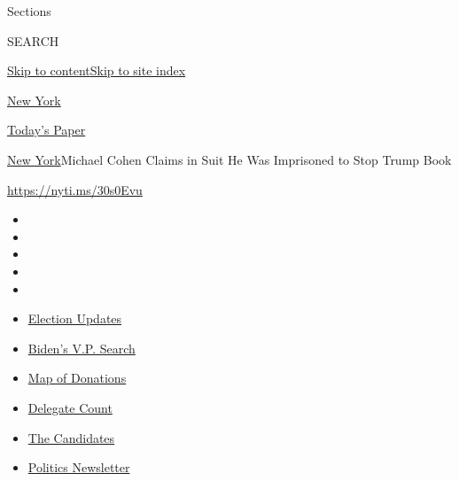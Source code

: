 Sections

SEARCH

\protect\hyperlink{site-content}{Skip to
content}\protect\hyperlink{site-index}{Skip to site index}

\href{https://www.nytimes3xbfgragh.onion/section/nyregion}{New York}

\href{https://myaccount.nytimes3xbfgragh.onion/auth/login?response_type=cookie\&client_id=vi}{}

\href{https://www.nytimes3xbfgragh.onion/section/todayspaper}{Today's
Paper}

\href{/section/nyregion}{New York}\textbar{}Michael Cohen Claims in Suit
He Was Imprisoned to Stop Trump Book

\url{https://nyti.ms/30s0Evu}

\begin{itemize}
\item
\item
\item
\item
\item
\end{itemize}

\begin{itemize}
\item
  \href{https://www.nytimes3xbfgragh.onion/2020/08/03/us/elections/biden-vs-trump.html?action=click\&pgtype=Article\&state=default\&region=TOP_BANNER\&context=storylines_menu}{Election
  Updates}
\item
  \href{https://www.nytimes3xbfgragh.onion/article/biden-vice-president-2020.html?action=click\&pgtype=Article\&state=default\&region=TOP_BANNER\&context=storylines_menu}{Biden's
  V.P. Search}
\item
  \href{https://www.nytimes3xbfgragh.onion/interactive/2020/07/24/us/politics/trump-biden-campaign-donors.html?action=click\&pgtype=Article\&state=default\&region=TOP_BANNER\&context=storylines_menu}{Map
  of Donations}
\item
  \href{https://www.nytimes3xbfgragh.onion/interactive/2020/us/elections/delegate-count-primary-results.html?action=click\&pgtype=Article\&state=default\&region=TOP_BANNER\&context=storylines_menu}{Delegate
  Count}
\item
  \href{https://www.nytimes3xbfgragh.onion/interactive/2019/us/politics/2020-presidential-candidates.html?action=click\&pgtype=Article\&state=default\&region=TOP_BANNER\&context=storylines_menu}{The
  Candidates}
\item
  \href{https://www.nytimes3xbfgragh.onion/newsletters/politics?action=click\&pgtype=Article\&state=default\&region=TOP_BANNER\&context=storylines_menu}{Politics
  Newsletter}
\end{itemize}

